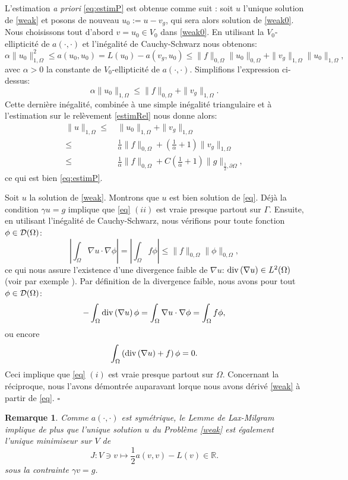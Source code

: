 \documentclass[11pt]{book}
\newtheorem{remark}[theorem]{Remarque}
\newcommand{\br}{\begin{remark}}
\newcommand{\er}{\end{remark}}
\newcommand{\cqfd}{{$\mbox{}$\hfill$\square$}}
\newcommand{\caD}{{\cal D}}
\newcommand{\R}{\mathbb{R}}
\renewcommand{\div} {{\rm{div} \,}}
\begin{document}
L'estimation \emph{a priori} \eqref{eq:estimP} est obtenue comme suit : soit $u$ l'unique solution de \eqref{weak} et posons de nouveau $u_0 := u - v_g$, qui sera alors solution de \eqref{weak0}. Nous choisissons tout d'abord $v = u_0 \in V_0$ dans \eqref{weak0}. En utilisant la $V_0$-ellipticité de $a(\cdot,\cdot)$ et l'inégalité de Cauchy-Schwarz nous obtenons:
\[
 \alpha \| u_0 \|^2_{1,\Omega} \leq a ( u_0 , u_0) = L(u_0) - a ( v_g , u_0) \leq 
 \| f \|_{0,\Omega} \| u_0 \|_{0,\Omega} + \| v_g \|_{1,\Omega} \| u_0 \|_{1,\Omega},
\]
avec $\alpha > 0$ la constante de $V_0$-ellipticité de $a(\cdot,\cdot)$. Simplifions l'expression ci-dessus:
\[
 \alpha \| u_0 \|_{1,\Omega} \leq 
 \| f \|_{0,\Omega}  + \| v_g \|_{1,\Omega}.
\]
Cette dernière inégalité, combinée à une simple inégalité triangulaire et à l'estimation sur le relèvement \eqref{estimRel} nous donne alors:
\begin{align*}
 \| u \|_{1,\Omega} \leq \, & \| u_0 \|_{1,\Omega} + \| v_g \|_{1,\Omega}\\
 \leq\, & \frac1\alpha \| f \|_{0,\Omega}  + \left (\frac1\alpha + 1 \right ) \| v_g \|_{1,\Omega}\\
 \leq\, & \frac1\alpha \| f \|_{0,\Omega}  + C \left (\frac1\alpha + 1 \right ) \| g \|_{\frac12,\partial \Omega},
\end{align*}
ce qui est bien \eqref{eq:estimP}.

Soit $u$ la solution de \eqref{weak}. Montrons que $u$ est bien solution de \eqref{eq}. Déjà la condition $\gamma u = g$ implique  que \eqref{eq} $(ii)$ est vraie presque partout sur $\Gamma$. Ensuite, en utilisant l'inégalité de Cauchy-Schwarz, nous vérifions pour toute fonction $\phi \in \caD(\Omega)$:
\[
\left | \int_\Omega \nabla u \cdot \nabla \phi \right | 
= \left | \int_\Omega f \phi \right |
\leq
\| f \|_{0, \Omega} \| \phi \|_{0,\Omega},
\]
ce qui nous assure l'existence d'une divergence faible de $\nabla u$: $\div(\nabla u) \in L^2(\Omega)$ (voir par exemple \cite[Lemme 4.2.7]{allaire-2007}). Par définition de la divergence faible, nous avons pour tout $\phi \in \caD(\Omega)$:
\[
- \int_\Omega \div(\nabla u) \, \phi = \int_\Omega \nabla u \cdot \nabla \phi = \int_\Omega f \phi,
\]
ou encore
\[
\int_\Omega \left ( \div (\nabla u) + f \right ) \phi = 0.
\]
Ceci implique que \eqref{eq} $(i)$ est vraie presque partout sur $\Omega$. Concernant la réciproque, nous l'avons démontrée auparavant lorque nous avons dérivé \eqref{weak} à partir de \eqref{eq}.
\cqfd

\br \label{rem:min}
Comme $a(\cdot,\cdot)$ est symétrique, le Lemme de Lax-Milgram implique de plus que l'unique solution $u$ du Problème \eqref{weak} est également l'unique minimiseur sur $V$ de
\begin{equation}\label{minJ}
J : V\ni v \mapsto \frac12 a(v,v) - L(v) \in \R. 
\end{equation}
sous la contrainte $\gamma v = g$.
\er
\end{document}
